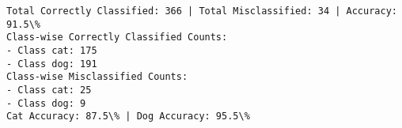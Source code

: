 \documentclass[8pt]{extarticle}
\begin{document}
    \begin{Verbatim}[commandchars=\\\{\}]
Total Correctly Classified: 366 | Total Misclassified: 34 | Accuracy: 91.5\%
Class-wise Correctly Classified Counts:
- Class cat: 175
- Class dog: 191
Class-wise Misclassified Counts:
- Class cat: 25
- Class dog: 9
Cat Accuracy: 87.5\% | Dog Accuracy: 95.5\%
    \end{Verbatim}

    \begin{center}
    \end{center}
    { \hspace*{\fill} \\}
    
    \begin{center}
    \end{center}
    { \hspace*{\fill} \\}
    
    \begin{center}
    \end{center}
    { \hspace*{\fill} \\}
    
    \begin{center}
    \end{center}
    { \hspace*{\fill} \\}
    
    \begin{center}
    \end{center}
    { \hspace*{\fill} \\}
    
    \begin{center}
    \end{center}
    { \hspace*{\fill} \\}
    
\end{document}
